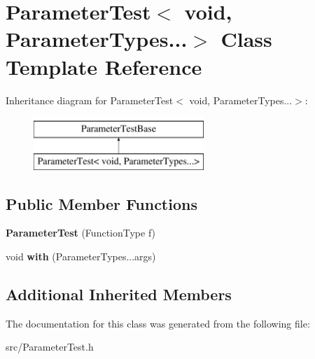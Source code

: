 \hypertarget{class_parameter_test_3_01void_00_01_parameter_types_8_8_8_4}{\section{Parameter\-Test$<$ void, Parameter\-Types...$>$ Class Template Reference}
\label{class_parameter_test_3_01void_00_01_parameter_types_8_8_8_4}
}
Inheritance diagram for Parameter\-Test$<$ void, Parameter\-Types...$>$\-:\begin{figure}[H]
\begin{center}
\leavevmode
\includegraphics[height=2.000000cm]{class_parameter_test_3_01void_00_01_parameter_types_8_8_8_4}
\end{center}
\end{figure}
\subsection*{Public Member Functions}
\begin{DoxyCompactItemize}
\item 
\hypertarget{class_parameter_test_3_01void_00_01_parameter_types_8_8_8_4_aea9c66b5df4e8cfc14202e9016c31427}{{\bfseries Parameter\-Test} (Function\-Type f)}\label{class_parameter_test_3_01void_00_01_parameter_types_8_8_8_4_aea9c66b5df4e8cfc14202e9016c31427}

\item 
\hypertarget{class_parameter_test_3_01void_00_01_parameter_types_8_8_8_4_a7642c56472ea823529c370e2e5c31028}{void {\bfseries with} (Parameter\-Types...\-args)}\label{class_parameter_test_3_01void_00_01_parameter_types_8_8_8_4_a7642c56472ea823529c370e2e5c31028}

\end{DoxyCompactItemize}
\subsection*{Additional Inherited Members}


The documentation for this class was generated from the following file\-:\begin{DoxyCompactItemize}
\item 
src/Parameter\-Test.\-h\end{DoxyCompactItemize}
